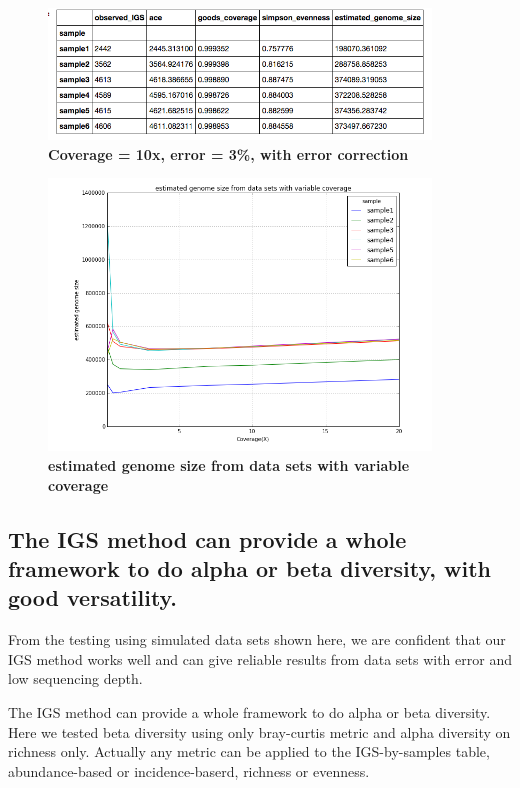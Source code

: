 \documentclass[12pt]{report}
\begin{document}
\begin{figure}[!ht]
 \centerline{\includegraphics[width=4in]{./figures/IGS_table_alpha1_10x_3_e.png}}
\caption{\bf Coverage = 10x, error = 3\%, with error correction}
\label{fig:IGS_table_alpha1_10x_3_e}
\end{figure}

\begin{figure}[!ht]
 \centerline{\includegraphics[width=4in]{./figures/IGS_figure_test_alpha.png}}
\caption{\bf estimated genome size from data sets with variable coverage}
\label{fig:IGS_figure_test_alpha}
\end{figure}


\subsection{The IGS method can provide a whole framework to do alpha or beta diversity, with good versatility.}

From the testing using simulated data sets shown here, we are confident that our IGS method works well and can give reliable results from data sets with error and low sequencing depth.

The IGS method can provide a whole framework to do alpha or beta diversity. Here we tested beta diversity using only bray-curtis metric and alpha diversity on richness only. Actually any metric can be applied to the IGS-by-samples table, abundance-based or incidence-baserd, richness or evenness.
\end{document}
